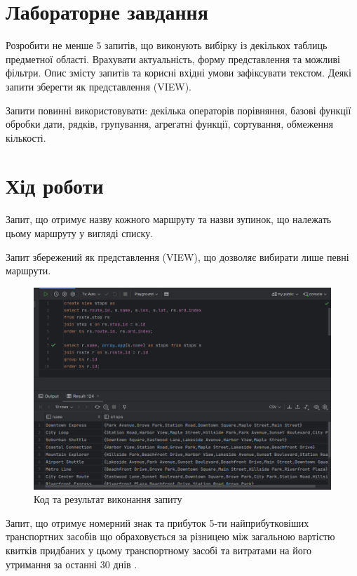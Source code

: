 \documentclass[14pt]{extreport}
\begin{document}
\begin{normalsize}
	\section*{Лабораторне завдання}
	Розробити не менше 5 запитів, що виконують вибірку із декількох таблиць предметної області. Врахувати актуальність, форму представлення та можливі фільтри. Опис змісту запитів та корисні вхідні умови зафіксувати текстом. Деякі запити зберегти як представлення (VIEW).
	
	Запити повинні використовувати: декілька операторів порівняння, базові функції обробки дати, рядків, групування, агрегатні функції, сортування, обмеження кількості.
	
	\section*{Хід роботи}
	\pagebreak
	Запит, що отримує назву кожного маршруту та назви зупинок, що належать цьому маршруту у вигляді списку.
	
	Запит збережений як представлення (VIEW), що дозволяє  вибирати лише певні маршрути.
	

	
	\begin{figure}[H]
		\centering
		\includegraphics[scale=0.5]{1}
		\caption{Код та результат виконання запиту}
	\end{figure}
	\pagebreak
	Запит, що отримує номерний знак та прибуток 5-ти найприбутковіших транспортних засобів що обраховується за різницею між загальною вартістю квитків придбаних у цьому транспортному засобі та витратами на його утримання за останні 30 днів .
	

\end{normalsize}
\end{document}
